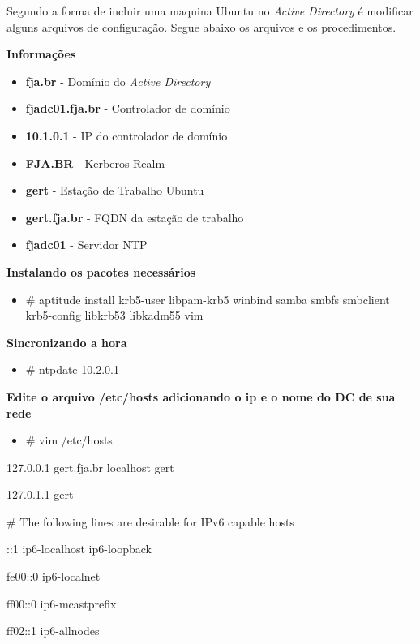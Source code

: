 Segundo \cite{UBUNTU-WIKI} a forma de incluir uma maquina Ubuntu no \textit{Active Directory} é modificar alguns arquivos de configuração.
Segue abaixo os arquivos e os procedimentos.

\textbf{Informações}

\begin{itemize}
	\item \textbf{fja.br} -  Domínio do \textit{Active Directory}
	\item \textbf{fjadc01.fja.br} - Controlador de domínio
	\item \textbf{10.1.0.1} - IP do controlador de domínio
	\item \textbf{FJA.BR} - Kerberos Realm
	\item \textbf{gert} - Estação de Trabalho Ubuntu
	\item \textbf{gert.fja.br} - FQDN da estação de trabalho
	\item \textbf{fjadc01} - Servidor NTP
\end{itemize}

\textbf{Instalando os pacotes necessários}

\begin{itemize}
	\item {\# aptitude install krb5-user libpam-krb5 winbind samba smbfs smbclient krb5-config libkrb53 libkadm55 vim}
\end{itemize}

\textbf{Sincronizando a hora}

\begin{itemize}
	\item {\# ntpdate 10.2.0.1}
\end{itemize}

\textbf{Edite o arquivo /etc/hosts adicionando o ip e o nome do DC de sua rede}

\begin{itemize}
	\item {\# vim /etc/hosts}
\end{itemize}

127.0.0.1       gert.fja.br localhost gert

127.0.1.1       gert

\# The following lines are desirable for IPv6 capable hosts

::1     ip6-localhost ip6-loopback

fe00::0 ip6-localnet

ff00::0 ip6-mcastprefix

ff02::1 ip6-allnodes

